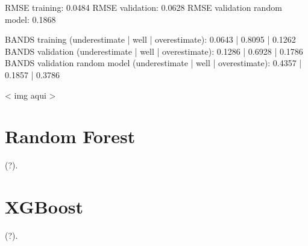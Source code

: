 RMSE training: 0.0484
RMSE validation: 0.0628
RMSE validation random model: 0.1868

BANDS training (underestimate | well | overestimate): 0.0643 | 0.8095 | 0.1262
BANDS validation (underestimate | well | overestimate): 0.1286 | 0.6928 | 0.1786
BANDS validation random model (underestimate | well | overestimate): 0.4357 | 0.1857 | 0.3786

< img aqui >

\section{Random Forest}
\label{sec:random_forest}

(?).

\section{XGBoost}
\label{sec:xgboost}

(?).

